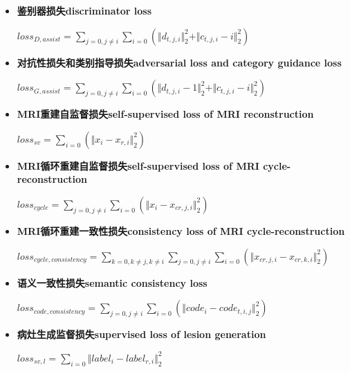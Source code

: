 \documentclass[letterpaper]{article} %
\begin{document}
\begin{itemize}
	\item \textbf{鉴别器损失discriminator loss}
	\begin{center}
		$loss_{D,assist}=\sum\limits_{j=0,j\neq i}\sum\limits_{i=0}(\Vert{d_{t,j,i}}\Vert_{2}^{2}+\Vert{c_{t,j,i}-i}\Vert_{2}^{2})$
	\end{center}
	
	\item \textbf{对抗性损失和类别指导损失adversarial loss and category guidance loss}
	\begin{center}
		$loss_{G,assist}=\sum\limits_{j=0,j\neq i}\sum\limits_{i=0}(\Vert{d_{t,j,i}-1}\Vert_{2}^{2}+\Vert{c_{t,j,i}-i}\Vert_{2}^{2})$
	\end{center}
	
	\item \textbf{MRI重建自监督损失self-supervised loss of MRI reconstruction}
	\begin{center}
		$loss_{sv}=\sum\limits_{i=0}(\Vert{x_i-x_{r,i}}\Vert_{2}^{2})$
	\end{center}
	
	\item \textbf{MRI循环重建自监督损失self-supervised loss of MRI cycle-reconstruction}
	
	\begin{center}
		$loss_{cycle}=\sum\limits_{j=0,j\neq i}\sum\limits_{i=0}(\Vert{x_i-x_{cr,j,i}}\Vert_{2}^{2})$
	\end{center}
	
	\item \textbf{MRI循环重建一致性损失consistency loss of MRI cycle-reconstruction}
	\begin{center}
		$loss_{cycle,consistency}=\sum\limits_{k=0,k\neq j,k\neq i}\sum\limits_{j=0,j\neq i}\sum\limits_{i=0}(\Vert{x_{cr,j,i}-x_{cr,k,i}}\Vert_{2}^{2})$
	\end{center}
	
	\item \textbf{语义一致性损失semantic consistency loss}
	\begin{center}
		$loss_{code,consistency}=\sum\limits_{j=0,j\neq i}\sum\limits_{i=0}(\Vert{code_i-code_{t,i,j}}\Vert_{2}^{2})$
	\end{center}
	
	\item \textbf{病灶生成监督损失supervised loss of lesion generation}
	\begin{center}
		$loss_{sv,l}=\sum\limits_{i=0}\Vert{label_i-label_{r,i}}\Vert_{2}^{2}$
	\end{center}
	
\end{itemize}
\end{document}
